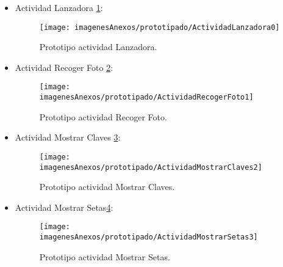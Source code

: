 \begin{itemize}

	
	\item Actividad Lanzadora \ref{figActividadLanzadora0}:
	\begin{figure}[h]
    	\begin{center}%
        	\begin{center}%
          	\texttt{[image: imagenesAnexos/prototipado/ActividadLanzadora0]}%
          	\caption{Prototipo actividad Lanzadora.}%
          	\label{figActividadLanzadora0}%
        	\end{center}%
  		\end{center}%
	\end{figure}%
	\clearpage
	
	\item Actividad Recoger Foto \ref{figActividadRecogerFoto1}:
	\begin{figure}[h]
    	\begin{center}%
        	\begin{center}%
          	\texttt{[image: imagenesAnexos/prototipado/ActividadRecogerFoto1]}%
          	\caption{Prototipo actividad Recoger Foto.}%
          	\label{figActividadRecogerFoto1}%
        	\end{center}%
  		\end{center}%
	\end{figure}%
	\clearpage
	
	\item Actividad Mostrar Claves \ref{figActividadMostrarClaves2}:
	\begin{figure}[h]
    	\begin{center}%
        	\begin{center}%
          	\texttt{[image: imagenesAnexos/prototipado/ActividadMostrarClaves2]}%
          	\caption{Prototipo actividad Mostrar Claves.}%
          	\label{figActividadMostrarClaves2}%
        	\end{center}%
  		\end{center}%
	\end{figure}%
	\clearpage
	
	
	\item Actividad Mostrar Setas\ref{figActividadMostrarSetas3}:
	\begin{figure}[h]
    	\begin{center}%
        	\begin{center}%
          	\texttt{[image: imagenesAnexos/prototipado/ActividadMostrarSetas3]}%
          	\caption{Prototipo actividad Mostrar Setas.}%
          	\label{figActividadMostrarSetas3}%
        	\end{center}%
  		\end{center}%
	\end{figure}%
	\clearpage
	

\end{itemize}
